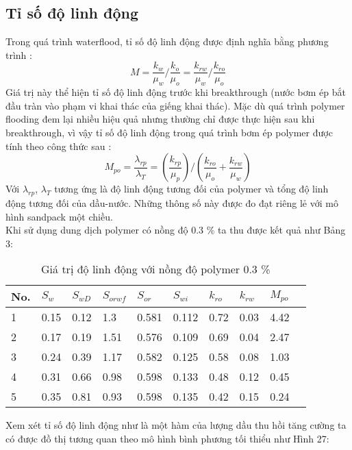 \documentclass[12pt,a4paper]{article}
\begin{document}
	\subsection{Tỉ số độ linh động}
	Trong quá trình waterflood, tỉ số độ linh động được định nghĩa bằng phương trình \cite{chang1978polymer}:
		\begin{equation}
		M=\frac{k_w}{\mu_w}/\frac{k_{o}}{\mu_o}=\frac{k_{rw}}{\mu_{w}}/\frac{k_{ro}}{\mu_o}
		\end{equation}
	Giá trị này thể hiện tỉ số độ linh động trước khi breakthrough (nước bơm ép bắt đầu tràn vào phạm vi khai thác của giếng khai thác). Mặc dù quá trình polymer flooding đem lại nhiều hiệu quả nhưng thường chỉ được thực hiện sau khi breakthrough, vì vậy tỉ số độ linh động trong quá trình bơm ép polymer được tính theo công thức sau \cite{chang1978polymer}:
		\begin{equation}
			M_{po}=\frac{\lambda_{rp}}{\lambda_T}=(\frac{k_{rp}}{\mu_p})/(\frac{k_{ro}}{\mu_o}+\frac{k_{rw}}{\mu_w})
		\end{equation}
	Với $\lambda_{rp}$, $\lambda_T$ tương ứng là độ linh động tương đối của polymer và tổng độ linh động tương đối của dầu-nước. Những thông số này được đo đạt riêng lẻ với mô hình sandpack một chiều.\\
	Khi sử dụng dung dịch polymer có nồng độ 0.3 \% ta thu được kết quả như Bảng 3:
\begin{table}[h]
\centering
\caption{Giá trị độ linh động với nồng độ polymer 0.3 \%}
\label{my-label}
\begin{tabularx}{\textwidth}{@{}XXXXXXXXXX@{}}
\toprule
No. & $S_w$ & $S_{wD}$ & $S_{orwf}$ & $S_{or}$ & $S_{wi}$ & $k_{ro}$ & $k_{rw}$ & $M_{po}$ \\ \midrule
1   & 0.15  & 0.12     & 1.3        & 0.581    & 0.112    & 0.72     & 0.03     & 4.42     \\
2   & 0.17  & 0.19     & 1.51       & 0.576    & 0.109    & 0.69     & 0.04     & 2.47     \\
3   & 0.24  & 0.39     & 1.17       & 0.582    & 0.125    & 0.58     & 0.08     & 1.03     \\
4   & 0.31  & 0.66     & 0.98       & 0.598    & 0.133    & 0.48     & 0.12     & 0.45     \\
5   & 0.35  & 0.81     & 0.93       & 0.598    & 0.135    & 0.42     & 0.15     & 0.24     \\ \bottomrule
\end{tabularx}
\end{table}
\newpage
\noindent
	Xem xét tỉ số độ linh động như là một hàm của lượng dầu thu hồi tăng cường ta có được đồ thị tương quan theo mô hình bình phương tối thiểu như Hình 27:
\end{document}
